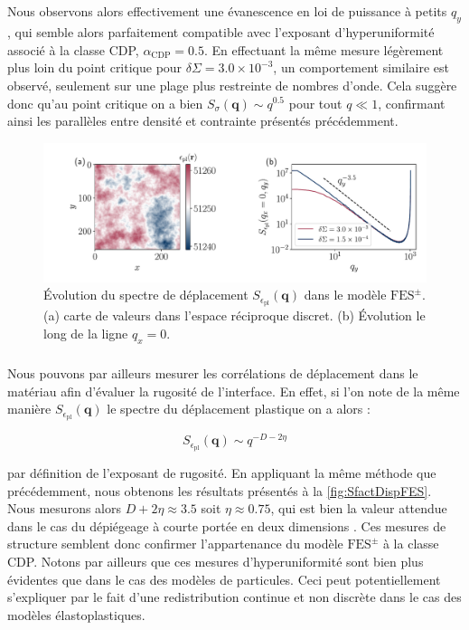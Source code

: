 \subparagraph{}Nous observons alors effectivement une évanescence en loi de puissance à petits $q_y$, qui semble alors parfaitement compatible avec l'exposant d'hyperuniformité associé à la classe CDP, $\alpha_\text{CDP} = 0.5$. En effectuant la même mesure légèrement plus loin du point critique pour $\delta\Sigma = 3.0\times 10^{-3}$, un comportement similaire est observé, seulement sur une plage plus restreinte de nombres d'onde. Cela suggère donc qu'au point critique on a bien $S_\sigma(\mathbf{q})\sim q^{0.5}$ pour tout $q\ll 1$, confirmant ainsi les parallèles entre densité et contrainte présentés précédemment.

\begin{figure}[h]
	\centering	\includegraphics[width=\textwidth]{Chapitre4/Figures/Correlations/Sfact_Disp_SRPNC.pdf}
	\caption{Évolution du spectre de déplacement $S_{\epsilon_\text{pl}}(\mathbf{q})$ dans le modèle $\text{FES}^\pm$. (a) carte de valeurs dans l'espace réciproque discret. (b) Évolution le long de la ligne $q_x=0$.}
	\label{fig:SfactDispFES}
\end{figure}

\subparagraph{}Nous pouvons par ailleurs mesurer les corrélations de déplacement dans le matériau afin d'évaluer la rugosité de l'interface. En effet, si l'on note de la même manière $S_{\epsilon_\text{pl}}(\mathbf{q})$ le spectre du déplacement plastique on a alors :

\begin{equation}
	S_{\epsilon_\text{pl}}(\mathbf{q}) \sim q^{-D-2\eta}
\end{equation}

\noindent par définition de l'exposant de rugosité. En appliquant la même méthode que précédemment, nous obtenons les résultats présentés à la \autoref{fig:SfactDispFES}. Nous mesurons alors $D+2\eta \approx 3.5$ soit $\eta\approx 0.75$, qui est bien la valeur attendue dans le cas du dépiégeage à courte portée en deux dimensions \cite{semeikin_roughness_2024}. Ces mesures de structure semblent donc confirmer l'appartenance du modèle $\text{FES}^\pm$ à la classe CDP. Notons par ailleurs que ces mesures d'hyperuniformité sont bien plus évidentes que dans le cas des modèles de particules. Ceci peut potentiellement s'expliquer par le fait d'une redistribution continue et non discrète dans le cas des modèles élastoplastiques.

